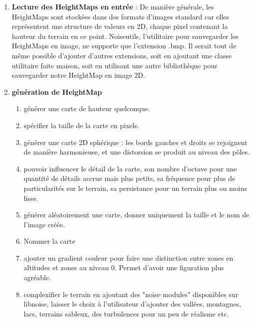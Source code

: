 \documentclass[12pt]{report}
\begin{document}
\begin{enumerate}
    \item \textbf{Lecture des HeightMaps en entrée} : De manière générale, les HeightMaps sont stockées dans des formats d'images standard car elles représentent une structure de valeurs en 2D, chaque pixel contenant la hauteur du terrain en ce point. Noiseutils, l'utilitaire pour sauvegarder les HeightMaps en image, ne supporte que l'extension .bmp. Il serait tout de même possible d'ajouter d'autres extensions, soit en ajoutant une classe utilitaire faite maison, soit en utilisant une autre bibliothèque pour sauvegarder notre HeightMap en image 2D.
    
    \item \textbf{génération de HeightMap}
    \begin{enumerate}
        \item générer une carte de hauteur quelconque.
        \item spécifier la taille de la carte en pixels.
        \item générer une carte 2D sphérique : les bords gauches et droits se rejoignent de manière harmonieuse, et une distorsion se produit au niveau des pôles.
        \item pouvoir influencer le détail de la carte, son nombre d'octave pour une quantité de détails accrue mais plus petits, sa fréquence pour plus de particularités sur le terrain, sa persistance pour un terrain plus ou moins lisse.
        \item générer aléatoirement une carte, donner uniquement la taille et le nom de l'image créée.
        \item Nommer la carte
        \item ajouter un gradient couleur pour faire une distinction entre zones en altitudes et zones au niveau 0. Permet d'avoir une figuration plus agréable.
        \item complexifier le terrain en ajoutant des "noise modules" disponibles sur libnoise, laisser le choix à l'utilisateur d'ajouter des vallées, montagnes, lacs, terrains sableux, des turbulences pour un peu de réalisme etc.
    \end{enumerate}
    

\end{enumerate}
\end{document}
